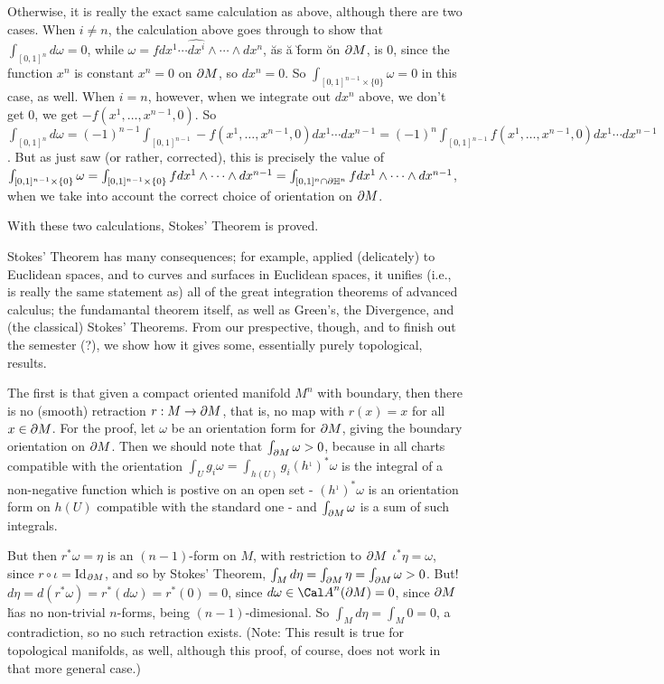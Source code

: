 Otherwise, it is really the exact same calculation as above, although there are two cases. When $i\neq n$,
the calculation above goes through to show that $\int_{[0,1]^n} d\omega = 0$,
while $\omega = f dx^1\cdots \hat{dx^i}\wedge\cdots\wedge dx^n$, \u{as} \u{a} \u{form}
\u{on} \u{$\partial M$}, is $0$, since the function $x^n$ is constant $x^n=0$ on $\partial M$, so $dx^n=0$.
So $\int_{[0,1]^{n-1}\times\{0\}}\omega=0$ in this case, as well. When $i=n$, however, when we integrate out
$dx^n$ above, we don't get $0$, we get $-f(x^1,\ldots,x^{n-1},0)$. So
$\int_{[0,1]^n} d\omega =(-1)^{n-1}\int_{[0,1]^{n-1}}-f(x^1,\ldots,x^{n-1},0)dx^1\cdots dx^{n-1}
=(-1)^{n}\int_{[0,1]^{n-1}}f(x^1,\ldots,x^{n-1},0)dx^1\cdots dx^{n-1}$.
But as just saw (or rather, corrected), this is precisely the value of 
$\int_{[0,1]^{n-1}\times\{0\}}\omega=\int_{[0,1]^{n-1}\times\{0\}}fdx^1\wedge\cdots\wedge dx^{n-1}=
\int_{[0,1]^{n}\cap\partial{\Bbb H}^n}fdx^1\wedge\cdots\wedge dx^{n-1}$, when we take into account the correct
choice of orientation on $\partial M$.

\ssk

With these two calculations, Stokes' Theorem is proved.

\msk

Stokes' Theorem has many consequences; for example, applied (delicately) to Euclidean spaces, and
to curves and surfaces in Euclidean spaces, it unifies (i.e., is really the same statement as)
all of the great integration theorems of advanced calculus; the fundamantal theorem itself, as
well as Green's, the Divergence, and (the classical) Stokes' Theorems. From our prespective, though,
and to finish out the semester (?), we show how it gives some, essentially purely topological, results.

\ssk

The first is that given a compact oriented manifold $M^n$ with boundary, then there is no (smooth)
retraction $r:M\rightarrow \partial M$, that is, no map with $r(x)=x$ for all $x\in \partial M$. For the proof, 
let $\omega$ be an orientation form for $\partial M$, giving the boundary orientation on $\partial M$.
Then we should note that $\int_{\partial M}\omega >0$, because in all charts compatible with the 
orientation $\int_Ug_i\omega =\int_{h(U)}g_i(h^{_1})^*\omega$ is the integral of a non-negative
function which is postive on an open set - $(h^{_1})^*\omega$ is an orientation
form on $h(U)$ compatible with the standard one - and $\int_{\partial M}\omega$ is a sum of such integrals.

But then $r^*\omega=\eta$ is an $(n-1)$-form on $M$, with restriction to $\partial M$ $\iota^*\eta=\omega$,
since $r\circ \iota =$Id$_{\partial M}$, and so by Stokes' Theorem, 
$\int_M d\eta=\int_{\partial M}\eta=\int_{\partial M}\omega>0$. But! $d\eta=d(r^*\omega)=r^*(d\omega)=r^*(0)=0$,
since $d\omega\in {\Cal A}^n(\del M)=0$, since $\partial M$ \u{has} no non-trivial $n$-forms, being
$(n-1)$-dimesional. So $\int_M d\eta=\int_M 0=0$, a contradiction, so no such retraction exists.
(Note: This result is true for topological manifolds, as well, although this proof, of course, does
not work in that more general case.)

